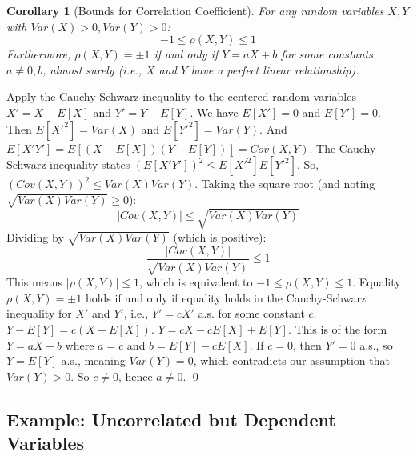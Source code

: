 \documentclass[11pt]{article}
\newtheorem{corollary}[theorem]{Corollary}
\renewenvironment{proof}{{\bfseries Proof.}}{\qed\par\bigskip}
\begin{document}
\begin{corollary}[Bounds for Correlation Coefficient]
For any random variables $X, Y$ with $Var(X)>0, Var(Y)>0$:
\begin{equation}
-1 \le \rho(X,Y) \le 1
\end{equation}
Furthermore, $\rho(X,Y) = \pm 1$ if and only if $Y = aX+b$ for some constants $a \neq 0, b$, almost surely (i.e., $X$ and $Y$ have a perfect linear relationship).
\end{corollary}
\begin{proof}
Apply the Cauchy-Schwarz inequality to the centered random variables $X' = X-E[X]$ and $Y' = Y-E[Y]$.
We have $E[X']=0$ and $E[Y']=0$.
Then $E[X'^2] = Var(X)$ and $E[Y'^2] = Var(Y)$.
And $E[X'Y'] = E[(X-E[X])(Y-E[Y])] = Cov(X,Y)$.
The Cauchy-Schwarz inequality states $(E[X'Y'])^2 \le E[X'^2]E[Y'^2]$.
So, $(Cov(X,Y))^2 \le Var(X)Var(Y)$.
Taking the square root (and noting $\sqrt{Var(X)Var(Y)} \ge 0$):
\begin{equation}
|Cov(X,Y)| \le \sqrt{Var(X)Var(Y)}
\end{equation}
Dividing by $\sqrt{Var(X)Var(Y)}$ (which is positive):
\begin{equation}
\frac{|Cov(X,Y)|}{\sqrt{Var(X)Var(Y)}} \le 1
\end{equation}
This means $|\rho(X,Y)| \le 1$, which is equivalent to $-1 \le \rho(X,Y) \le 1$.
Equality $\rho(X,Y) = \pm 1$ holds if and only if equality holds in the Cauchy-Schwarz inequality for $X'$ and $Y'$, i.e., $Y' = cX'$ a.s. for some constant $c$.
$Y-E[Y] = c(X-E[X])$.
$Y = cX - cE[X] + E[Y]$.
This is of the form $Y = aX+b$ where $a=c$ and $b = E[Y]-cE[X]$.
If $c=0$, then $Y'=0$ a.s., so $Y=E[Y]$ a.s., meaning $Var(Y)=0$, which contradicts our assumption that $Var(Y)>0$. So $c \neq 0$, hence $a \neq 0$.
\end{proof}

\subsection{Example: Uncorrelated but Dependent Variables}
\end{document}

